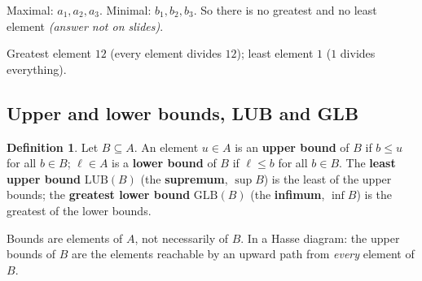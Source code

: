\documentclass{fkt-notes}
\theoremstyle{definition}
\newtheorem*{defn}{Definition}
\begin{document}
\begin{example}[Ex.~1: a zigzag]\leavevmode\par\noindent
  \begin{minipage}[c]{0.45\textwidth}
    \centering
  \end{minipage}\hfill
  \begin{minipage}[c]{0.52\textwidth}
    Maximal: $a_1,a_2,a_3$. Minimal: $b_1,b_2,b_3$. So there is no
    greatest and no least element \emph{(answer not on slides)}.
  \end{minipage}
\end{example}

\begin{example}[Ex.~2: $D_{12}=\{1,2,3,4,6,12\}$ under divisibility]\leavevmode\par\noindent
  \begin{minipage}[c]{0.3\textwidth}
    \centering
  \end{minipage}\hfill
  \begin{minipage}[c]{0.66\textwidth}
    Greatest element $12$ (every element divides $12$); least element $1$
    ($1$ divides everything).
  \end{minipage}
\end{example}

\subsection{Upper and lower bounds, LUB and GLB}
%
\begin{defn}
  Let $B\subseteq A$. An element $u\in A$ is an \textbf{upper bound} of
  $B$ if $b\le u$ for all $b\in B$; $\ell\in A$ is a \textbf{lower bound}
  of $B$ if $\ell\le b$ for all $b\in B$.
  The \textbf{least upper bound} $\mathrm{LUB}(B)$ (the
  \textbf{supremum}, $\sup B$) is the least of the upper bounds; the
  \textbf{greatest lower bound} $\mathrm{GLB}(B)$ (the
  \textbf{infimum}, $\inf B$) is the greatest of the lower bounds.
\end{defn}
Bounds are elements of $A$, not necessarily of $B$. In a Hasse
diagram: the upper bounds of $B$ are the elements reachable by an
upward path from \emph{every} element of $B$.
\end{document}
